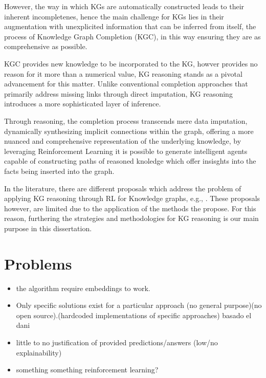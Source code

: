 However, the way in which KGs are automatically constructed leads to their inherent incompletenes, hence the main challenge for KGs lies in their augmentation with unexplicited information that can be inferred from itself, the process of Knowledge Graph Completion (KGC), in this way ensuring they are as comprehensive as possible.

KGC provides new knowledge to be incorporated to the KG, howver provides no reason for it more than a numerical value, KG reasoning stands as a pivotal advancement for this matter. Unlike conventional completion approaches that primarily address missing links through direct imputation, KG reasoning introduces a more sophisticated layer of inference.

Through reasoning, the completion process transcends mere data imputation, dynamically synthesizing implicit connections within the graph, offering a more nuanced and comprehensive representation of the underlying knowledge, by leveraging Reinforcement Learning it is possible to generate intelligent agents capable of constructing paths of reasoned knoledge which offer insisghts into the facts being inserted into the graph.

In the literature, there are different proposals which address the problem of
applying KG reasoning through RL for Knowledge graphs, e.g., \cite{}. These proposals however, are limited due to the application of the methods the propose. For this reason, furthering the strategies and methodologies for KG reasoning is our main purpose in this dissertation.

\section{Problems}\label{sec:moti-problems}
\begin{itemize}
    \item the algorithm require embeddings to work.
    \item Only specific solutions exist for a particular approach (no general purpose)(no open source).(hardcoded implementations of specific approaches) basado el dani
    \item little to no justification of provided predictions/answers (low/no explainability)
    \item something something reinforcement learning?
\end{itemize}

